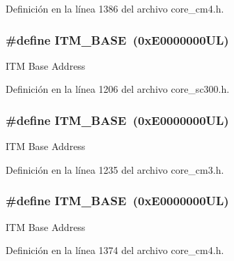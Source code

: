 Definición en la línea 1386 del archivo core\+\_\+cm4.\+h.

\subsubsection[{\texorpdfstring{I\+T\+M\+\_\+\+B\+A\+SE}{ITM_BASE}}]{\setlength{\rightskip}{0pt plus 5cm}\#define I\+T\+M\+\_\+\+B\+A\+SE~(0x\+E0000000\+U\+L)}\hypertarget{group___c_m_s_i_s__core__base_gadd76251e412a195ec0a8f47227a8359e}{}\label{group___c_m_s_i_s__core__base_gadd76251e412a195ec0a8f47227a8359e}
I\+TM Base Address 

Definición en la línea 1206 del archivo core\+\_\+sc300.\+h.

\subsubsection[{\texorpdfstring{I\+T\+M\+\_\+\+B\+A\+SE}{ITM_BASE}}]{\setlength{\rightskip}{0pt plus 5cm}\#define I\+T\+M\+\_\+\+B\+A\+SE~(0x\+E0000000\+U\+L)}\hypertarget{group___c_m_s_i_s__core__base_gadd76251e412a195ec0a8f47227a8359e}{}\label{group___c_m_s_i_s__core__base_gadd76251e412a195ec0a8f47227a8359e}
I\+TM Base Address 

Definición en la línea 1235 del archivo core\+\_\+cm3.\+h.

\subsubsection[{\texorpdfstring{I\+T\+M\+\_\+\+B\+A\+SE}{ITM_BASE}}]{\setlength{\rightskip}{0pt plus 5cm}\#define I\+T\+M\+\_\+\+B\+A\+SE~(0x\+E0000000\+U\+L)}\hypertarget{group___c_m_s_i_s__core__base_gadd76251e412a195ec0a8f47227a8359e}{}\label{group___c_m_s_i_s__core__base_gadd76251e412a195ec0a8f47227a8359e}
I\+TM Base Address 

Definición en la línea 1374 del archivo core\+\_\+cm4.\+h.

